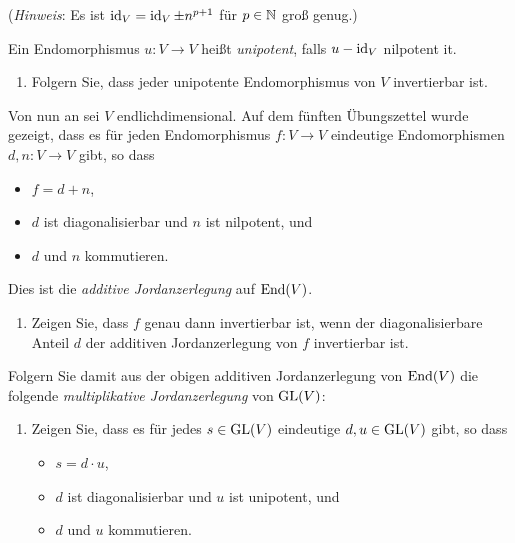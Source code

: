 \begin{question}[subtitle = Die multiplikative Jordanzerlegung]{4}
\begin{enumerate}[leftmargin=*]
      (\emph{Hinweis}: Es ist $\operatorname{id}_V = \operatorname{id}_V \pm n^{p+1}$ für $p \in \mathbb{N}$ groß genug.)
  \end{enumerate}
  Ein Endomorphismus $u \colon V \to V$ heißt \emph{unipotent}, falls $u - \operatorname{id}_V$ nilpotent it.
  \begin{enumerate}[leftmargin=*, resume]
    \item
      Folgern Sie, dass jeder unipotente Endomorphismus von $V$ invertierbar ist.
  \end{enumerate}
  Von nun an sei $V$ endlichdimensional.
  Auf dem fünften Übungszettel wurde gezeigt, dass es für jeden Endomorphismus $f \colon V \to V$ eindeutige Endomorphismen $d,n \colon V \to V$ gibt, so dass
  \begin{itemize}
    \item 
      $f = d + n$,
    \item
      $d$ ist diagonalisierbar und $n$ ist nilpotent, und
    \item
      $d$ und $n$ kommutieren.
  \end{itemize}
  Dies ist die \emph{additive Jordanzerlegung} auf $\operatorname{End}(V)$.
  \begin{enumerate}[leftmargin=*, resume]
    \item
      Zeigen Sie, dass $f$ genau dann invertierbar ist, wenn der diagonalisierbare Anteil $d$ der additiven Jordanzerlegung von $f$ invertierbar ist.
  \end{enumerate}
  Folgern Sie damit aus der obigen additiven Jordanzerlegung von $\operatorname{End}(V)$ die folgende \emph{multiplikative Jordanzerlegung} von $\operatorname{GL}(V)$:
  \begin{enumerate}[leftmargin=*, resume]
    \item
      Zeigen Sie, dass es für jedes $s \in \operatorname{GL}(V)$ eindeutige $d, u \in \operatorname{GL}(V)$ gibt, so dass
      \begin{itemize}
        \item
          $s = d \cdot u$,
        \item
          $d$ ist diagonalisierbar und $u$ ist unipotent, und
        \item
          $d$ und $u$ kommutieren.
      \end{itemize}
  \end{enumerate}
\end{question}


